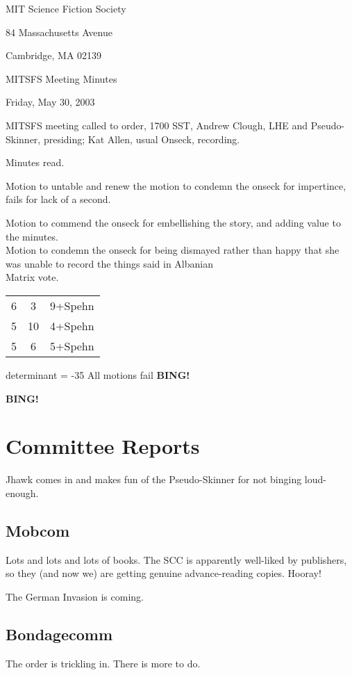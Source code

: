 \documentclass[12pt]{article}
\newcommand{\bing}{{\bf BING!} }
\newcommand{\goto}[1]{\bing \vskip 12pt \section*{#1}}
\begin{document}
\begin{center}

MIT Science Fiction Society 

84 Massachusetts Avenue

Cambridge, MA 02139

\vspace{12pt}

MITSFS Meeting Minutes 

Friday, May 30, 2003

\end{center}
 
\vspace{18pt}

\setlength{\parskip}{6pt}

\noindent
MITSFS meeting called to order, 1700 SST, Andrew Clough, LHE and
Pseudo-Skinner, presiding; Kat Allen, usual Onseck, recording.

Minutes read.

Motion to untable and renew the motion to condemn the onseck for
impertince, fails for lack of a second.

Motion to commend the onseck for embellishing the story, and adding
value to the minutes.\\
Motion to condemn the onseck for being dismayed rather than happy that
she was unable to record the things said in Albanian\\
Matrix vote.\\
\begin{tabular}{c|c|c}
6 & 3 & 9+Spehn\\
5 & 10 & 4+Spehn\\
5 & 6 & 5+Spehn\\
\end{tabular}
determinant = -35  All motions fail \bing


\goto{Committee Reports}
Jhawk comes in and makes fun of the Pseudo-Skinner for not binging loud-enough.

\subsection*{Mobcom}
Lots and lots and lots of books. The SCC is apparently well-liked by
publishers, so they (and now we) are getting genuine advance-reading
copies. Hooray!

The German Invasion is coming.

\subsection*{Bondagecomm}
The order is trickling in. There is more to do.
\end{document}
